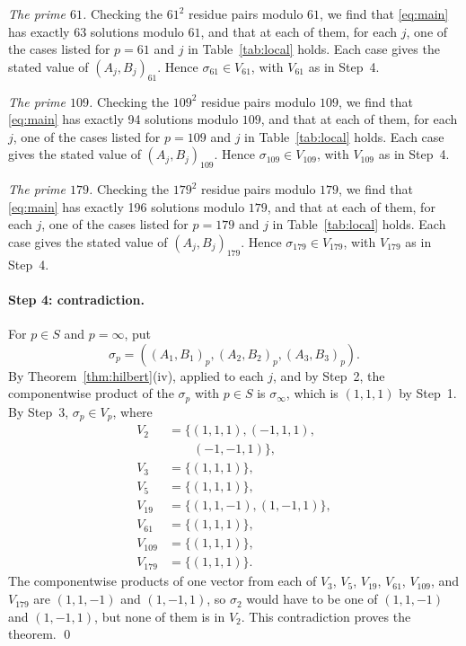 \documentclass[11pt]{article}
\begin{document}
\emph{The prime $61$.} Checking the $61^2$ residue pairs modulo $61$, we find that \eqref{eq:main} has exactly 63 solutions modulo $61$, and that at each of them, for each $j$, one of the cases listed for $p=61$ and $j$ in Table~\ref{tab:local} holds. Each case gives the stated value of $(A_j,B_j)_{61}$. Hence $\sigma_{61}\in V_{61}$, with $V_{61}$ as in Step~4.

\emph{The prime $109$.} Checking the $109^2$ residue pairs modulo $109$, we find that \eqref{eq:main} has exactly 94 solutions modulo $109$, and that at each of them, for each $j$, one of the cases listed for $p=109$ and $j$ in Table~\ref{tab:local} holds. Each case gives the stated value of $(A_j,B_j)_{109}$. Hence $\sigma_{109}\in V_{109}$, with $V_{109}$ as in Step~4.

\emph{The prime $179$.} Checking the $179^2$ residue pairs modulo $179$, we find that \eqref{eq:main} has exactly 196 solutions modulo $179$, and that at each of them, for each $j$, one of the cases listed for $p=179$ and $j$ in Table~\ref{tab:local} holds. Each case gives the stated value of $(A_j,B_j)_{179}$. Hence $\sigma_{179}\in V_{179}$, with $V_{179}$ as in Step~4.

\paragraph{Step 4: contradiction.} For $p\in S$ and $p=\infty$, put \[\sigma_p=((A_{1},B_{1})_p,(A_{2},B_{2})_p,(A_{3},B_{3})_p).\] By Theorem~\ref{thm:hilbert}(iv), applied to each $j$, and by Step~2, the componentwise product of the $\sigma_p$ with $p\in S$ is $\sigma_\infty$, which is $(1,1,1)$ by Step~1. By Step~3, $\sigma_p\in V_p$, where
\begin{align*}
V_{2}&=\{(1,1,1),(-1,1,1),\\
&\qquad(-1,-1,1)\},\\
V_{3}&=\{(1,1,1)\},\\
V_{5}&=\{(1,1,1)\},\\
V_{19}&=\{(1,1,-1),(1,-1,1)\},\\
V_{61}&=\{(1,1,1)\},\\
V_{109}&=\{(1,1,1)\},\\
V_{179}&=\{(1,1,1)\}.
\end{align*}The componentwise products of one vector from each of $V_{3}$, $V_{5}$, $V_{19}$, $V_{61}$, $V_{109}$, and $V_{179}$ are $(1,1,-1)$ and $(1,-1,1)$, so $\sigma_{2}$ would have to be one of $(1,1,-1)$ and $(1,-1,1)$, but none of them is in $V_{2}$. This contradiction proves the theorem.
\qed
\end{document}

